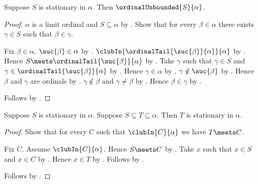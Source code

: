 \begin{proposition}\label{stationary_is_unbounded}
    Suppose $S$ is stationary in $\alpha$.
    Then $\ordinalUnbounded{S}{\alpha}$.
\end{proposition}
\begin{proof}
    $\alpha$ is a limit ordinal and $S\subseteq\alpha$
        by .
    Show that for every $\beta\in\alpha$ there exists $\gamma\in S$
        such that $\beta\in\gamma$.
    \begin{subproof}
        Fix $\beta\in\alpha$.
        $\suc{\beta}\in\alpha$ by .
        $\clubIn{\ordinalTail{\suc{\beta}}{\alpha}}{\alpha}$
            by .
        Hence $S\meets\ordinalTail{\suc{\beta}}{\alpha}$
            by .
        Take $\gamma$ such that $\gamma\in S$ and
            $\gamma\in\ordinalTail{\suc{\beta}}{\alpha}$
            by .
        Hence $\gamma\in\alpha$ by .
        $\gamma\notin\suc{\beta}$
            by .
        Hence $\beta$ and $\gamma$ are ordinals
            by .
        $\gamma\notin\beta$ and $\gamma\neq\beta$
            by .
        Hence $\beta\in\gamma$ by .
    \end{subproof}
    Follows by .
\end{proof}

\begin{proposition}\label{stationary_superset}
    Suppose $S$ is stationary in $\alpha$.
    Suppose $S\subseteq T\subseteq\alpha$.
    Then $T$ is stationary in $\alpha$.
\end{proposition}
\begin{proof}
    Show that for every $C$ such that $\clubIn{C}{\alpha}$
        we have $T\meets C$.
    \begin{subproof}
        Fix $C$.
        Assume $\clubIn{C}{\alpha}$.
        Hence $S\meets C$ by .
        Take $x$ such that $x\in S$ and $x\in C$
            by .
        Hence $x\in T$ by .
        Follows by .
    \end{subproof}
    Follows by .
\end{proof}

